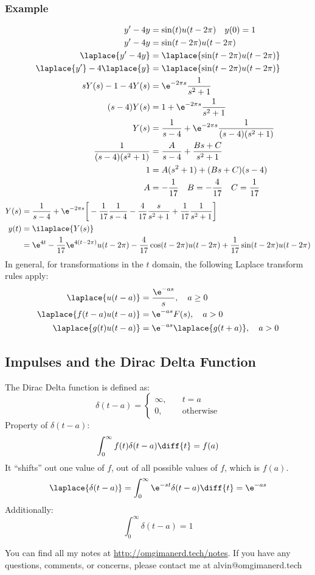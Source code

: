 \documentclass{math}
\begin{document}
\subsubsection*{Example}
\begin{align*}
  y'-4y &= \sin(t)u(t-2\pi) \quad y(0) = 1 \\
  y'-4y &= \sin(t-2\pi)u(t-2\pi) \\
  \laplace{y'-4y} &= \laplace{\sin(t-2\pi)u(t-2\pi)} \\
  \laplace{y'}-4\laplace{y} &= \laplace{\sin(t-2\pi)u(t-2\pi)} \\
  sY(s)-1-4Y(s) &= \e^{-2\pi s}\frac{1}{s^2+1} \\
  (s-4)Y(s) &= 1+\e^{-2\pi s}\frac{1}{s^2+1} \\
  Y(s) &= \frac{1}{s-4}+\e^{-2\pi s}\frac{1}{(s-4)(s^2+1)} \\
  \frac{1}{(s-4)(s^2+1)} &= \frac{A}{s-4}+\frac{Bs+C}{s^2+1} \\
  1 &= A(s^2+1)+(Bs+C)(s-4) \\
  A &= -\frac{1}{17} \quad B = -\frac{4}{17} \quad C = \frac{1}{17}
\end{align*}
\begin{align*}
  Y(s) &= \frac{1}{s-4}+\e^{-2\pi s}\bigg[
    -\frac{1}{17}\frac{1}{s-4}-\frac{4}{17}\frac{s}{s^2+1}+
    \frac{1}{17}\frac{1}{s^2+1}\bigg] \\
  y(t) &= \ilaplace{Y(s)} \\
  &= \e^{4t}-\frac{1}{17}\e^{4(t-2\pi)}u(t-2\pi)-
    \frac{4}{17}\cos(t-2\pi)u(t-2\pi)+\frac{1}{17}\sin(t-2\pi)u(t-2\pi) \\
\end{align*}
In general, for transformations in the \( t \) domain, the following Laplace
transform rules apply:
\begin{align*}
  \laplace{u(t-a)} &= \frac{\e^{-as}}{s}, \quad a\ge0 \\
  \laplace{f(t-a)u(t-a)} &= \e^{-as}F(s), \quad a>0 \\
  \laplace{g(t)u(t-a)} &= \e^{-as}\laplace{g(t+a)}, \quad a>0
\end{align*}

\subsection*{Impulses and the Dirac Delta Function}
The Dirac Delta function is defined as:
\[ \delta(t-a) = \begin{cases}
  \infty, &\quad t=a \\
  0, &\quad \text{otherwise}
\end{cases} \]
Property of \( \delta(t-a) \):
\[ \int_{0}^{\infty}f(t)\delta(t-a)\diff{t} = f(a) \]
It ``shifts'' out one value of \( f \), out of all possible values of \( f \),
which is \( f(a) \).
\[ \laplace{\delta(t-a)} = \int_{0}^{\infty}\e^{-st}\delta(t-a)\diff{t} =
  \e^{-as} \]
Additionally:
\[ \int_{0}^{\infty}\delta(t-a) = 1 \]

\begin{center}
  You can find all my notes at \url{http://omgimanerd.tech/notes}. If you have
  any questions, comments, or concerns, please contact me at
  alvin@omgimanerd.tech
\end{center}
\end{document}
